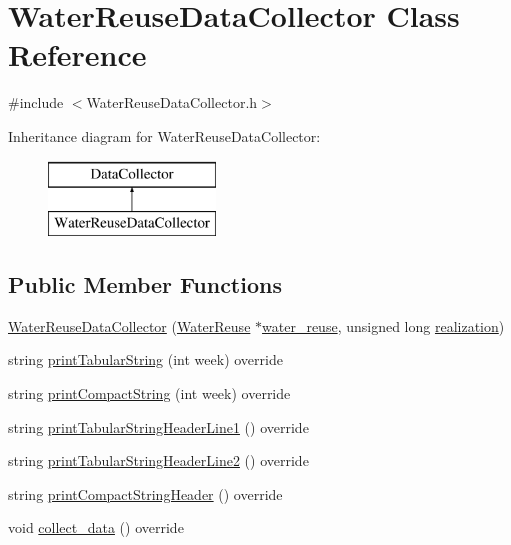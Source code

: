 \hypertarget{classWaterReuseDataCollector}{}\section{Water\+Reuse\+Data\+Collector Class Reference}
\label{classWaterReuseDataCollector}


{\ttfamily \#include $<$Water\+Reuse\+Data\+Collector.\+h$>$}

Inheritance diagram for Water\+Reuse\+Data\+Collector\+:\begin{figure}[H]
\begin{center}
\leavevmode
\includegraphics[height=2.000000cm]{classWaterReuseDataCollector}
\end{center}
\end{figure}
\subsection*{Public Member Functions}
\begin{DoxyCompactItemize}
\item 
\mbox{\hyperlink{classWaterReuseDataCollector_a0bd64f585d6645023f6cf5a485a89416_a0bd64f585d6645023f6cf5a485a89416}{Water\+Reuse\+Data\+Collector}} (\mbox{\hyperlink{classWaterReuse}{Water\+Reuse}} $\ast$\mbox{\hyperlink{classWaterReuseDataCollector_a4ecf7e2de50415ac298104816b17d887_a4ecf7e2de50415ac298104816b17d887}{water\+\_\+reuse}}, unsigned long \mbox{\hyperlink{classDataCollector_a9ef2887466fe3123aa19ef956a219b96_a9ef2887466fe3123aa19ef956a219b96}{realization}})
\item 
string \mbox{\hyperlink{classWaterReuseDataCollector_af8b637ad080f354dc145f11580834da8_af8b637ad080f354dc145f11580834da8}{print\+Tabular\+String}} (int week) override
\item 
string \mbox{\hyperlink{classWaterReuseDataCollector_a6b37aa4b2031cf0a1a1326da2bd64420_a6b37aa4b2031cf0a1a1326da2bd64420}{print\+Compact\+String}} (int week) override
\item 
string \mbox{\hyperlink{classWaterReuseDataCollector_a1065ad3627b913dccb6ecbf0e6acc6e6_a1065ad3627b913dccb6ecbf0e6acc6e6}{print\+Tabular\+String\+Header\+Line1}} () override
\item 
string \mbox{\hyperlink{classWaterReuseDataCollector_a8cead3771efabeb62dcf069008810f43_a8cead3771efabeb62dcf069008810f43}{print\+Tabular\+String\+Header\+Line2}} () override
\item 
string \mbox{\hyperlink{classWaterReuseDataCollector_afef08bead3f2c60c2b9c975864456ef1_afef08bead3f2c60c2b9c975864456ef1}{print\+Compact\+String\+Header}} () override
\item 
void \mbox{\hyperlink{classWaterReuseDataCollector_af4d8d437372c06d84ff889a5288cc96e_af4d8d437372c06d84ff889a5288cc96e}{collect\+\_\+data}} () override
\end{DoxyCompactItemize}
